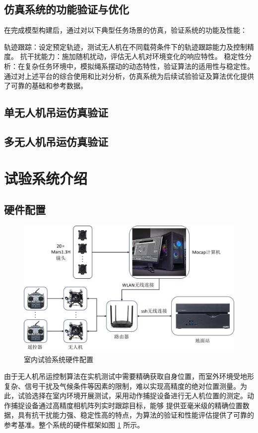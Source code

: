 \documentclass[lang=chs, degree=master, blindreview=false, winfonts=true]{yanputhesis}
\begin{document}
\subsection{仿真系统的功能验证与优化}
在完成模型构建后，通过对以下典型任务场景的仿真，验证系统的功能及性能：

轨迹跟踪：设定预定轨迹，测试无人机在不同载荷条件下的轨迹跟踪能力及控制精度。
抗干扰能力：施加随机扰动，评估无人机对环境变化的响应特性。
稳定性分析：在复杂任务环境中，模拟绳系摆动的动态特性，验证算法的适用性与稳定性。
通过对上述平台的综合使用和比对分析，仿真系统为后续试验验证及算法优化提供了可靠的基础和参考数据。

\subsection{单无人机吊运仿真验证}


\subsection{多无人机吊运仿真验证}

\section{试验系统介绍}


\subsection{硬件配置}
\begin{figure}[hbt!]
	\centering
	\includegraphics[width=36pc]{picture/5_4.png} 
	\caption{室内试验系统硬件配置} 
	\label{framework}
\end{figure}
由于无人机吊运控制算法在实机测试中需要精确获取自身位置，而室外环境受地形复杂、信号干扰及气候条件等因素的限制，难以实现高精度的绝对位置测量。为此，试验选择在室内环境开展测试，采用动作捕捉设备进行无人机位置的测定。动作捕捉设备通过高精度相机阵列实时跟踪目标，能够
提供亚毫米级的精确位置数据，具有抗干扰能力强、稳定性高的特点，为算法的验证和性能评估提供了可靠的参考基准。整个系统的硬件框架如图 \ref{framework} 所示。
\end{document}
